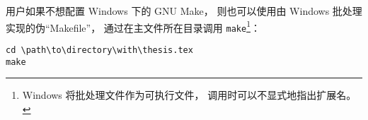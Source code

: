 	用户如果不想配置 Windows 下的 GNU Make，
	则也可以使用由 Windows 批处理实现的伪“Makefile”，
	通过在主文件所在目录调用 \verb|make|\footnote{%
		Windows 将批处理文件作为可执行文件，
		调用时可以不显式地指出扩展名。%
	}：
\begin{Verbatim}[frame = single]
cd \path\to\directory\with\thesis.tex
make
\end{Verbatim}

